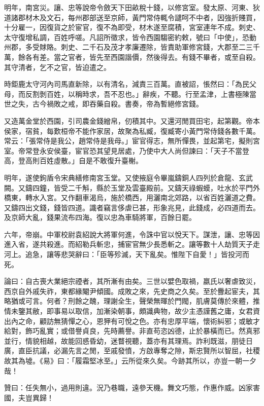\begin{pinyinscope}
明年，南宮災。讓、忠等說帝令斂天下田畝稅十錢，以修宮室。發太原、河東、狄道諸郡材木及文石，每州郡部送至京師，黃門常侍輒令譴呵不中者，因強折賤買，十分雇一，因復貨之於宦官，復不為即受，材木遂至腐積，宮室連年不成。刺史、太守復增私調，百姓呼嗟。凡詔所徵求，皆令西園騶密約敕，號曰「中使」，恐動州郡，多受賕賂。刺史、二千石及茂才孝廉遷除，皆責助軍修宮錢，大郡至二三千萬，餘各有差。當之官者，皆先至西園諧價，然後得去。有錢不畢者，或至自殺。其守清者，乞不之官，皆迫遣之。

時鉅鹿太守河內司馬直新除，以有清名，減責三百萬。直被詔，悵然曰：「為民父母，而反割剝百姓，以稱時求，吾不忍也。」辭疾，不聽。行至孟津，上書極陳當世之失，古今禍敗之戒，即吞藥自殺。書奏，帝為暫絕修宮錢。

又造萬金堂於西園，引司農金錢繒帛，仞積其中。又還河閒買田宅，起第觀。帝本侯家，宿貧，每歎桓帝不能作家居，故聚為私臧，復臧寄小黃門常侍錢各數千萬。常云：「張常侍是我公，趙常侍是我母。」宦官得志，無所憚畏，並起第宅，擬則宮室。帝常登永安侯臺，宦官恐其望見居處，乃使中大人尚但諫曰：「天子不當登高，登高則百姓虛散。」自是不敢復升臺榭。

明年，遂使鉤盾令宋典繕修南宮玉堂。又使掖庭令畢嵐鑄銅人四列於倉龍、玄武闕。又鑄四鐘，皆受二千斛，縣於玉堂及雲臺殿前。又鑄天祿蝦蟆，吐水於平門外橋東，轉水入宮。又作翻車渴烏，施於橋西，用灑南北郊路，以省百姓灑道之費。又鑄四出文錢，錢皆四道。識者竊言侈虐已甚，形象兆見，此錢成，必四道而去。及京師大亂，錢果流布四海。復以忠為車騎將軍，百餘日罷。

六年，帝崩。中軍校尉袁紹說大將軍何進，令誅中官以悅天下。謀泄，讓、忠等因進入省，遂共殺進。而紹勒兵斬忠，捕宦官無少長悉斬之。讓等數十人劫質天子走河上。追急，讓等悲哭辭曰：「臣等殄滅，天下亂矣。惟陛下自愛！」皆投河而死。

論曰：自古喪大業絕宗禋者，其所漸有由矣。三世以嬖色取禍，嬴氏以奢虐致災，西京自外戚失祚，東都緣閹尹傾國。成敗之來，先史商之久矣。至於釁起宦夫，其略猶或可言。何者？刑餘之醜，理謝全生，聲榮無暉於門閥，肌膚莫傳於來體，推情未鑒其敝，即事易以取信，加漸染朝事，頗識典物，故少主憑謹舊之庸，女君資出內之命，顧訪無猜憚之心，恩狎有可悅之色。亦有忠厚平端，懷術糾邪；或敏才給對，飾巧亂實；或借譽貞良，先時薦譽。非直苟恣凶德，止於暴橫而已。然真邪並行，情貌相越，故能回惑昏幼，迷瞀視聽，蓋亦有其理焉。詐利既滋，朋徒日廣，直臣抗議，必漏先言之閒，至戚發憤，方啟專奪之隙，斯忠賢所以智屈，社稷故其為墟。《易》曰：「履霜堅冰至。」云所從來久矣。今跡其所以，亦豈一朝一夕哉！

贊曰：任失無小，過用則違。況乃巷職，遠參天機。舞文巧態，作惠作威。凶家害國，夫豈異歸！


\end{pinyinscope}